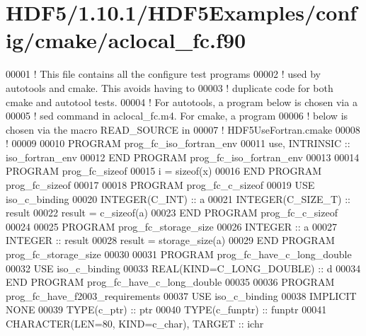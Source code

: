 \hypertarget{_h_d_f5_21_810_81_2_h_d_f5_examples_2config_2cmake_2aclocal__fc_8f90_source}{}\section{H\+D\+F5/1.10.1/\+H\+D\+F5\+Examples/config/cmake/aclocal\+\_\+fc.f90}
\label{_h_d_f5_21_810_81_2_h_d_f5_examples_2config_2cmake_2aclocal__fc_8f90_source}

\begin{DoxyCode}
00001 \textcolor{comment}{! This file contains all the configure test programs }
00002 \textcolor{comment}{! used by autotools and cmake. This avoids having to}
00003 \textcolor{comment}{! duplicate code for both cmake and autotool tests.}
00004 \textcolor{comment}{! For autotools, a program below is chosen via a}
00005 \textcolor{comment}{! sed command in aclocal\_fc.m4. For cmake, a program}
00006 \textcolor{comment}{! below is chosen via the macro READ\_SOURCE in }
00007 \textcolor{comment}{! HDF5UseFortran.cmake}
00008 \textcolor{comment}{!}
00009 
00010 \textcolor{keyword}{PROGRAM} prog\_fc\_iso\_fortran\_env
00011   use, \textcolor{keywordtype}{INTRINSIC} :: iso\_fortran\_env
00012 \textcolor{keyword}{END PROGRAM }prog\_fc\_iso\_fortran\_env
00013 
00014 \textcolor{keyword}{PROGRAM} prog\_fc\_sizeof
00015   i = sizeof(x)
00016 \textcolor{keyword}{END PROGRAM }prog\_fc\_sizeof
00017 
00018 \textcolor{keyword}{PROGRAM} prog\_fc\_c\_sizeof
00019   \textcolor{keywordtype}{USE }iso\_c\_binding
00020   \textcolor{keywordtype}{INTEGER(C\_INT)} :: a
00021   \textcolor{keywordtype}{INTEGER(C\_SIZE\_T)} :: result
00022   result = c\_sizeof(a)
00023 \textcolor{keyword}{END PROGRAM }prog\_fc\_c\_sizeof
00024 
00025 \textcolor{keyword}{PROGRAM} prog\_fc\_storage\_size
00026   \textcolor{keywordtype}{INTEGER} :: a
00027   \textcolor{keywordtype}{INTEGER} :: result
00028   result = storage\_size(a)
00029 \textcolor{keyword}{END PROGRAM }prog\_fc\_storage\_size
00030 
00031 \textcolor{keyword}{PROGRAM} prog\_fc\_have\_c\_long\_double
00032   \textcolor{keywordtype}{USE }iso\_c\_binding
00033   \textcolor{keywordtype}{REAL(KIND=C\_LONG\_DOUBLE)} :: d
00034 \textcolor{keyword}{END PROGRAM }prog\_fc\_have\_c\_long\_double
00035 
00036 \textcolor{keyword}{PROGRAM} prog\_fc\_have\_f2003\_requirements
00037   \textcolor{keywordtype}{USE }iso\_c\_binding
00038   \textcolor{keywordtype}{IMPLICIT NONE}
00039   \textcolor{keywordtype}{TYPE}(c\_ptr) :: ptr
00040   \textcolor{keywordtype}{TYPE}(c\_funptr) :: funptr
00041   \textcolor{keywordtype}{CHARACTER(LEN=80, KIND=c\_char)}, \textcolor{keywordtype}{TARGET} :: ichr

\end{DoxyCode}
